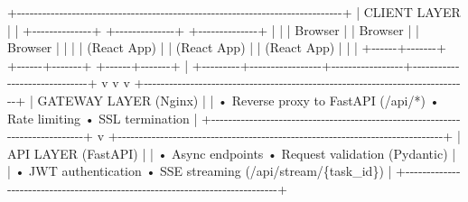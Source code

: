 \documentclass[
]{article}
\newenvironment{Shaded}{}{}
\newcommand{\NormalTok}[1]{#1}
\begin{document}
\begin{Shaded}
\begin{Highlighting}[]
\NormalTok{+{-}{-}{-}{-}{-}{-}{-}{-}{-}{-}{-}{-}{-}{-}{-}{-}{-}{-}{-}{-}{-}{-}{-}{-}{-}{-}{-}{-}{-}{-}{-}{-}{-}{-}{-}{-}{-}{-}{-}{-}{-}{-}{-}{-}{-}{-}{-}{-}{-}{-}{-}{-}{-}{-}{-}{-}{-}{-}{-}{-}{-}{-}{-}{-}{-}{-}{-}{-}{-}{-}{-}{-}{-}{-}{-}{-}{-}+}
\NormalTok{|                              CLIENT LAYER                                    |}
\NormalTok{|  +{-}{-}{-}{-}{-}{-}{-}{-}{-}{-}{-}{-}{-}{-}+  +{-}{-}{-}{-}{-}{-}{-}{-}{-}{-}{-}{-}{-}{-}+  +{-}{-}{-}{-}{-}{-}{-}{-}{-}{-}{-}{-}{-}{-}+                      |}
\NormalTok{|  |   Browser    |  |   Browser    |  |   Browser    |                      |}
\NormalTok{|  |  (React App) |  |  (React App) |  |  (React App) |                      |}
\NormalTok{|  +{-}{-}{-}{-}{-}{-}+{-}{-}{-}{-}{-}{-}{-}+  +{-}{-}{-}{-}{-}{-}+{-}{-}{-}{-}{-}{-}{-}+  +{-}{-}{-}{-}{-}{-}+{-}{-}{-}{-}{-}{-}{-}+                      |}
\NormalTok{+{-}{-}{-}{-}{-}{-}{-}{-}{-}+{-}{-}{-}{-}{-}{-}{-}{-}{-}{-}{-}{-}{-}{-}{-}{-}{-}+{-}{-}{-}{-}{-}{-}{-}{-}{-}{-}{-}{-}{-}{-}{-}{-}{-}+{-}{-}{-}{-}{-}{-}{-}{-}{-}{-}{-}{-}{-}{-}{-}{-}{-}{-}{-}{-}{-}{-}{-}{-}{-}{-}{-}{-}{-}{-}+}
\NormalTok{          v                 v                 v}
\NormalTok{+{-}{-}{-}{-}{-}{-}{-}{-}{-}{-}{-}{-}{-}{-}{-}{-}{-}{-}{-}{-}{-}{-}{-}{-}{-}{-}{-}{-}{-}{-}{-}{-}{-}{-}{-}{-}{-}{-}{-}{-}{-}{-}{-}{-}{-}{-}{-}{-}{-}{-}{-}{-}{-}{-}{-}{-}{-}{-}{-}{-}{-}{-}{-}{-}{-}{-}{-}{-}{-}{-}{-}{-}{-}{-}{-}{-}{-}+}
\NormalTok{|                           GATEWAY LAYER (Nginx)                            |}
\NormalTok{|  • Reverse proxy to FastAPI (/api/*) • Rate limiting • SSL termination       |}
\NormalTok{+{-}{-}{-}{-}{-}{-}{-}{-}{-}{-}{-}{-}{-}{-}{-}{-}{-}{-}{-}{-}{-}{-}{-}{-}{-}{-}{-}{-}{-}{-}{-}{-}{-}{-}{-}{-}{-}{-}{-}{-}{-}{-}{-}{-}{-}{-}{-}{-}{-}{-}{-}{-}{-}{-}{-}{-}{-}{-}{-}{-}{-}{-}{-}{-}{-}{-}{-}{-}{-}{-}{-}{-}{-}{-}{-}{-}{-}+}
\NormalTok{                            v}
\NormalTok{+{-}{-}{-}{-}{-}{-}{-}{-}{-}{-}{-}{-}{-}{-}{-}{-}{-}{-}{-}{-}{-}{-}{-}{-}{-}{-}{-}{-}{-}{-}{-}{-}{-}{-}{-}{-}{-}{-}{-}{-}{-}{-}{-}{-}{-}{-}{-}{-}{-}{-}{-}{-}{-}{-}{-}{-}{-}{-}{-}{-}{-}{-}{-}{-}{-}{-}{-}{-}{-}{-}{-}{-}{-}{-}{-}{-}{-}+}
\NormalTok{|                         API LAYER (FastAPI)                                |}
\NormalTok{|  • Async endpoints      • Request validation (Pydantic)                     |}
\NormalTok{|  • JWT authentication   • SSE streaming (/api/stream/\{task\_id\})             |}
\NormalTok{+{-}{-}{-}{-}{-}{-}{-}{-}{-}{-}{-}{-}{-}{-}{-}{-}{-}{-}{-}{-}{-}{-}{-}{-}{-}{-}{-}{-}{-}{-}{-}{-}{-}{-}{-}{-}{-}{-}{-}{-}{-}{-}{-}{-}{-}{-}{-}{-}{-}{-}{-}{-}{-}{-}{-}{-}{-}{-}{-}{-}{-}{-}{-}{-}{-}{-}{-}{-}{-}{-}{-}{-}{-}{-}{-}{-}{-}+}

\end{Highlighting}
\end{Shaded}
\end{document}
